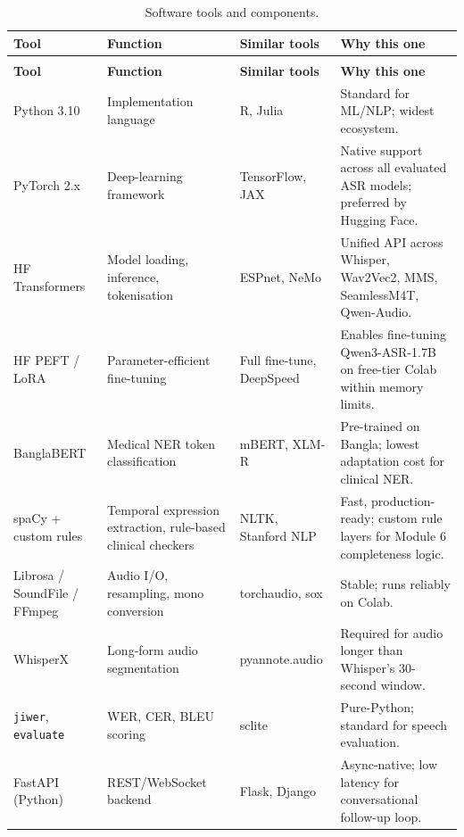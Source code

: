 \documentclass[12pt,a4paper]{article}
\begin{document}
\begin{longtable}{>{\raggedright\arraybackslash}p{2.8cm}
                  >{\raggedright\arraybackslash}p{3.2cm}
                  >{\raggedright\arraybackslash}p{2.5cm}
                  >{\raggedright\arraybackslash}p{4.5cm}}
\caption{Software tools and components.}\label{tab:tools}\\
\toprule
\textbf{Tool} & \textbf{Function} & \textbf{Similar tools} & \textbf{Why this one} \\
\midrule
\endfirsthead
\multicolumn{4}{c}{\itshape Table~\ref{tab:tools} continued}\\
\toprule
\textbf{Tool} & \textbf{Function} & \textbf{Similar tools} & \textbf{Why this one} \\
\midrule
\endhead
\midrule\multicolumn{4}{r}{\itshape continued\ldots}\endfoot
\bottomrule\endlastfoot
Python 3.10 & Implementation language & R, Julia & Standard for ML/NLP; widest ecosystem. \\
PyTorch 2.x & Deep-learning framework & TensorFlow, JAX & Native support across all evaluated ASR models; preferred by Hugging Face. \\
HF Transformers \cite{pd:transformers} & Model loading, inference, tokenisation & ESPnet, NeMo & Unified API across Whisper, Wav2Vec2, MMS, SeamlessM4T, Qwen-Audio. \\
HF PEFT / LoRA \cite{pd:lora} & Parameter-efficient fine-tuning & Full fine-tune, DeepSpeed & Enables fine-tuning Qwen3-ASR-1.7B on free-tier Colab within memory limits. \\
BanglaBERT \cite{pd:banglabert} & Medical NER token classification & mBERT, XLM-R & Pre-trained on Bangla; lowest adaptation cost for clinical NER. \\
spaCy + custom rules & Temporal expression extraction, rule-based clinical checkers & NLTK, Stanford NLP & Fast, production-ready; custom rule layers for Module 6 completeness logic. \\
Librosa / SoundFile / FFmpeg & Audio I/O, resampling, mono conversion & torchaudio, sox & Stable; runs reliably on Colab. \\
WhisperX \cite{pd:whisperx} & Long-form audio segmentation & pyannote.audio & Required for audio longer than Whisper's 30-second window. \\
\texttt{jiwer}, \texttt{evaluate} & WER, CER, BLEU scoring & sclite & Pure-Python; standard for speech evaluation. \\
FastAPI (Python) & REST/WebSocket backend & Flask, Django & Async-native; low latency for conversational follow-up loop. \\

\end{longtable}
\end{document}
